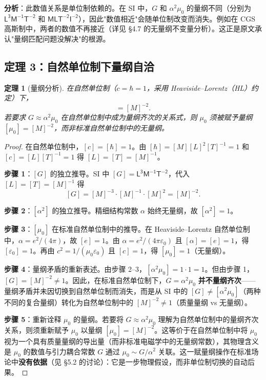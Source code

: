 \documentclass[12pt,a4paper]{article}
\newtheorem{theorem}{定理}
\begin{document}
\medskip

\textbf{分析}：此数值关系是单位制依赖的。在 SI 中，$G$ 和 $\alpha^2\mu_0$ 的量纲不同（分别为 $\mathsf{L^3M^{-1}T^{-2}}$ 和 $\mathsf{MLT^{-2}I^{-2}}$），因此"数值相近"会随单位制改变而消失。例如在 CGS 高斯制中，两者的数值不再接近（详见 §4.7 的无量纲不变量分析）。这正是原文承认"量纲匹配问题没解决"的根源。

\subsection{定理 3：自然单位制下量纲自洽}

\begin{theorem}[量纲分析]
在自然单位制（$c = \hbar = 1$，采用 Heaviside--Lorentz（HL）约定\cite{peskin1995}）下，
\begin{equation}
  [G] = [M]^{-2}.
\end{equation}
若要求 $G \approx \alpha^2\mu_0$ 在自然单位制中成为量纲齐次的关系式，则 $\mu_0$ 须被赋予量纲 $[\mu_0] = [M]^{-2}$，而非标准自然单位制中的无量纲。
\end{theorem}

\begin{proof}
在自然单位制中，$[c] = [\hbar] = 1$。由 $[\hbar] = [M][L]^2[T]^{-1} = 1$ 和 $[c] = [L][T]^{-1} = 1$ 得 $[L] = [T] = [M]^{-1}$。

\textbf{步骤 1}：$[G]$ 的独立推导。SI 中 $[G] = \mathsf{L^3 M^{-1} T^{-2}}$，代入 $[L]=[T]=[M]^{-1}$ 得
\[
  [G] = [M]^{-3} \cdot [M]^{-1} \cdot [M]^{2} = [M]^{-2}.
\]

\textbf{步骤 2}：$[\alpha^2]$ 的独立推导。精细结构常数 $\alpha$ 始终无量纲，故 $[\alpha^2] = 1$。

\textbf{步骤 3}：$[\mu_0]$ 在标准自然单位制中的推导。在 Heaviside--Lorentz 自然单位制中，$\alpha = e^2/(4\pi)$，故 $[e] = 1$。由 $\alpha = e^2/(4\pi\varepsilon_0)$ 且 $[\alpha]=[e]=1$，得 $[\varepsilon_0] = 1$。再由 $c^2 = 1/(\mu_0\varepsilon_0)$ 且 $[c]=1$，得 $[\mu_0] = 1$（无量纲）。

\textbf{步骤 4}：量纲矛盾的重新表述。由步骤 2--3，$[\alpha^2\mu_0] = 1 \cdot 1 = 1$。但由步骤 1，$[G] = [M]^{-2} \neq 1$。因此，在标准自然单位制下，$G = \alpha^2\mu_0$ \textbf{并不量纲齐次}——量纲矛盾并未因切换到自然单位制而消失，而是从 SI 中的 $[G] \neq [\alpha^2\mu_0]$（两种不同的复合量纲）转化为自然单位制中的 $[M]^{-2} \neq 1$（质量量纲 vs 无量纲）。

\textbf{步骤 5}：重新诠释 $\mu_0$ 的量纲。若要将 $G \approx \alpha^2\mu_0$ 理解为自然单位制中的量纲齐次关系，则须重新赋予 $\mu_0$ 以量纲 $[\mu_0] = [M]^{-2}$。这等价于在自然单位制中将 $\mu_0$ 视为一个具有质量量纲的导出量（而非标准电磁学中的无量纲常数），其物理含义是 $\mu_0$ 的数值与引力耦合常数 $G$ 通过 $\mu_0 \sim G/\alpha^2$ 关联。这一赋量纲操作在标准场论中\textbf{没有依据}（见 §5.2 的讨论）：它是一步物理假设，而非单位制切换的自动后果。
\end{proof}
\end{document}
